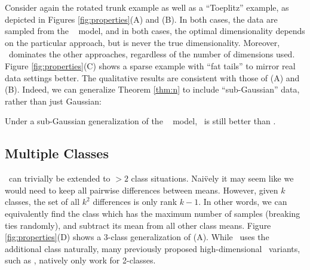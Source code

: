 \documentclass[10pt]{article}
\begin{document}
Consider again the rotated trunk example as well as a ``Toeplitz'' example, as depicted in Figures \ref{fig:properties}(A) and (B).  In both cases, the data are sampled from the \Lda~ model, and in both cases, the optimal dimensionality depends on the particular approach, but is never the true dimensionality.  Moreover, \Lol~dominates the other approaches, regardless of the number of dimensions used.
% 
Figure \ref{fig:properties}(C) shows a sparse example with ``fat tails'' to mirror real data settings better.  The qualitative results are consistent with those of (A) and (B).  Indeed, we can generalize Theorem \ref{thm:n} to include ``sub-Gaussian'' data, rather than just Gaussian:

\begin{thm} \label{thm:FAT}
Under a sub-Gaussian generalization of the \Lda~ model, \Lol~is still better than \Pca.
\end{thm}

\subsection*{Multiple Classes}

\Lol~can trivially be extended to $>2$ class situations.  Nai\"vely it may seem like we would need to keep all pairwise differences between means.  However, given $k$ classes, the set of all $k^2$ differences is only rank $k-1$.  In other words, we can equivalently find the class which has the maximum number of samples (breaking ties randomly), and subtract its mean from all other class means.  Figure \ref{fig:properties}(D) shows a 3-class generalization of (A).  While \Lol~uses the additional class naturally,  many previously proposed high-dimensional \Fld~variants, such as , natively only work for 2-classes.
\end{document}
